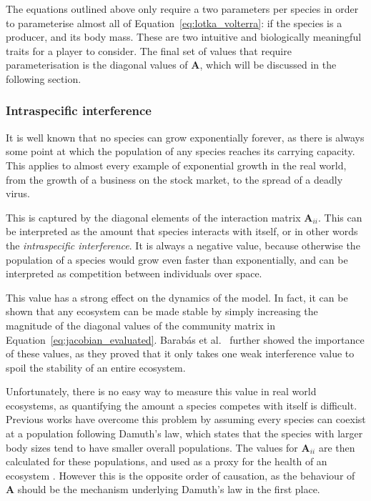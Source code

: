 The equations outlined above only require a two parameters per species in order to parameterise almost all of Equation~\eqref{eq:lotka_volterra}: if the species is a producer, and its body mass. These are two intuitive and biologically meaningful traits for a player to consider.
The final set of values that require parameterisation is the diagonal values of $\mathbf{A}$, which will be discussed in the following section.

\subsubsection{Intraspecific interference}
It is well known that no species can grow exponentially forever, as there is always some point at which the population of any species reaches its carrying capacity. 
This applies to almost every example of exponential growth in the real world, from the growth of a business on the stock market, to the spread of a deadly virus.

This is captured by the diagonal elements of the interaction matrix $\mathbf{A}_{ii}$. This can be interpreted as the amount that species interacts with itself, or in other words the \emph{intraspecific interference}. It is always a negative value, because otherwise the population of a species would grow even faster than exponentially, and can be interpreted as competition between individuals over space.

This value has a strong effect on the dynamics of the model. In fact, it can be shown that any ecosystem can be made stable by simply increasing the magnitude of the diagonal values of the community matrix in Equation~\eqref{eq:jacobian_evaluated}. 
Barab\'as et al.\ \cite{Barabas2017} further showed the importance of these values, as they proved that it only takes one weak interference value to spoil the stability of an entire ecosystem.

Unfortunately, there is no easy way to measure this value in real world ecosystems, as quantifying the amount a species competes with itself is difficult. Previous works have overcome this problem by assuming every species can coexist at a population following Damuth's law, which states that the species with larger body sizes tend to have smaller overall populations. The values for $\mathbf{A}_{ii}$ are then calculated for these populations, and used as a proxy for the health of an ecosystem \cite{Tang2014Correlation, Pawar2015}. However this is the opposite order of causation, as the behaviour of $\mathbf{A}$ should be the mechanism underlying Damuth's law in the first place.

